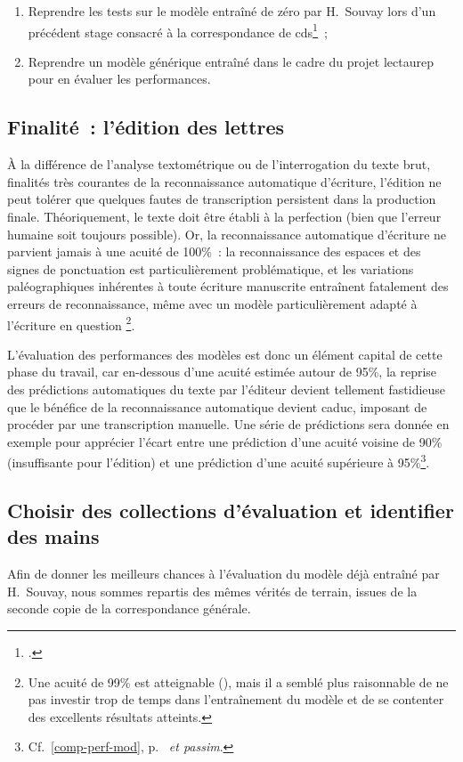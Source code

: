 \documentclass[a4paper,12pt,twoside]{book}
\begin{document}
				\begin{enumerate}
					\item Reprendre les tests sur le modèle entraîné de zéro par H.~Souvay lors d'un précédent stage consacré à la correspondance de \gls{cds}\footcite{souvayCorrespondanceConstanceSalm2021}~;
					\item Reprendre un modèle générique entraîné dans le cadre du projet \gls{lectaurep} pour en évaluer les performances.
				\end{enumerate}
		
			\subsection{Finalité~: l'édition des lettres}
				À la différence de l'analyse textométrique ou de l'interrogation du texte brut, finalités très courantes de la reconnaissance automatique d'écriture, l'édition ne peut tolérer que quelques fautes de transcription persistent dans la production finale. Théoriquement, le texte doit être établi à la perfection (bien que l'erreur humaine soit toujours possible). Or, la reconnaissance automatique d'écriture ne parvient jamais à une acuité de 100\%~: la reconnaissance des espaces et des signes de ponctuation est particulièrement problématique, et les variations paléographiques inhérentes à toute écriture manuscrite entraînent fatalement des erreurs de reconnaissance, même avec un modèle particulièrement adapté à l'écriture en question
				\footnote{Une acuité de 99\% est atteignable (\cite{stokesEScriptoriumVREManuscript2021}), mais il a semblé plus raisonnable de ne pas investir trop de temps dans l'entraînement du modèle et de se contenter des excellents résultats atteints.}.
				
				L'évaluation des performances des modèles est donc un élément capital de cette phase du travail, car en-dessous d'une acuité estimée autour de 95\%, la reprise des prédictions automatiques du texte par l'éditeur devient tellement fastidieuse que le bénéfice de la reconnaissance automatique devient caduc, imposant de procéder par une transcription manuelle. Une série de prédictions sera donnée en exemple pour apprécier l'écart entre une prédiction d'une acuité voisine de 90\% (insuffisante pour l'édition) et une prédiction d'une acuité supérieure à 95\%\footnote{Cf.~\ref{comp-perf-mod}, p.~\pageref{comp-perf-mod} \textit{et passim}.}.
				
			\subsection{Choisir des collections d'évaluation et identifier des mains}
				Afin de donner les meilleurs chances à l'évaluation du modèle déjà entraîné par H.~Souvay, nous sommes repartis des mêmes vérités de terrain, issues de la seconde copie de la correspondance générale.
				
\end{document}
